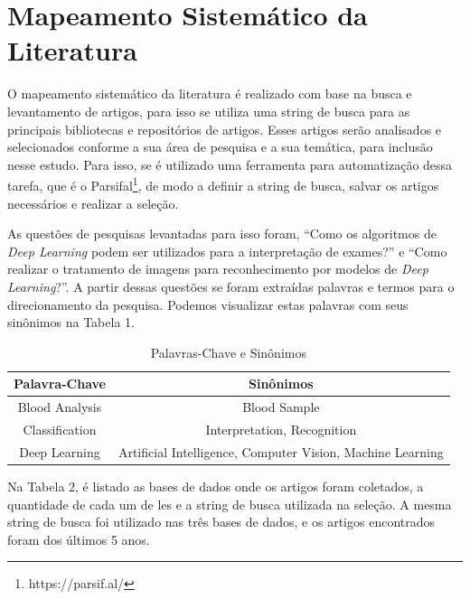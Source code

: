 \section{Mapeamento Sistemático da Literatura}

O mapeamento sistemático da literatura é realizado com base na busca e levantamento de artigos, para isso se utiliza uma string de busca para as principais bibliotecas e repositórios de artigos. Esses artigos serão analisados e selecionados conforme a sua área de pesquisa e a sua temática, para inclusão nesse estudo. Para isso, se é utilizado uma ferramenta para automatização dessa tarefa, que é o Parsifal\footnote[1]{https://parsif.al/}, de modo a definir a string de busca, salvar os artigos necessários e realizar a seleção.

As questões de pesquisas levantadas para isso foram, ``Como os algoritmos de \emph{Deep Learning} podem ser utilizados para a interpretação de exames?'' e ``Como realizar o tratamento de imagens para reconhecimento por modelos de \emph{Deep Learning}?''. A partir dessas questões se foram extraídas palavras e termos para o direcionamento da pesquisa. Podemos visualizar estas palavras com seus sinônimos na Tabela 1.

\begin{table}[!htb]
	\centering
	\caption{Palavras-Chave e Sinônimos}
	\label{tbl:palavrasChave}
	\begin{tabular}{|c|c|}
		\hline
		\textbf{Palavra-Chave} & \textbf{Sinônimos}                                        \\ \hline
		Blood Analysis         & Blood Sample                                               \\ \hline
		Classification         & Interpretation, Recognition                                \\ \hline
		Deep Learning          & Artificial Intelligence, Computer Vision, Machine Learning \\ \hline
	\end{tabular}
	\vspace{6pt}
\end{table}

Na Tabela 2, é listado as bases de dados onde os artigos foram coletados, a quantidade de cada um de les e a string de busca utilizada na seleção. A mesma string de busca foi utilizado nas três bases de dados, e os artigos encontrados foram dos últimos 5 anos.

